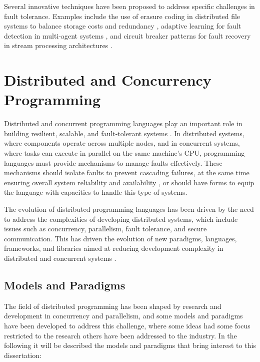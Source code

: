 Several innovative techniques have been proposed to address specific challenges in fault tolerance. Examples include the use of erasure coding in distributed file systems to balance storage costs and redundancy \cite{Arafa2021}, adaptive learning for fault detection in multi-agent systems \cite{Khalili2021}, and circuit breaker patterns for fault recovery in stream processing architectures \cite{Knasmueller2021}. 



\section{Distributed and Concurrency Programming}

Distributed and concurrent programming languages play an important role in building resilient, scalable, and fault-tolerant systems \cite{Armstrong2013}. In distributed systems, where components operate across multiple nodes, and in concurrent systems, where tasks can execute in parallel on the same machine's \gls{CPU}, programming languages must provide mechanisms to manage faults effectively. These mechanisms should isolate faults to prevent cascading failures, at the same time ensuring overall system reliability and availability \cite{Nystrom2009}, or should have forms to equip the language with capacities to handle this type of systems.

The evolution of distributed programming languages has been driven by the need to address the complexities of developing distributed systems, which include issues such as concurrency, parallelism, fault tolerance, and secure communication. This has driven the evolution of new paradigms, languages, frameworks, and libraries aimed at reducing development complexity in distributed and concurrent systems \cite{Valkov2018}.

\subsection{Models and Paradigms}

The field of distributed programming has been shaped by research and development in concurrency and parallelism, and some models and paradigms have been developed to address this challenge, where some ideas had some focus restricted to the research others have been addressed to the industry. In the following it will be described the models and paradigms that bring interest to this dissertation:
